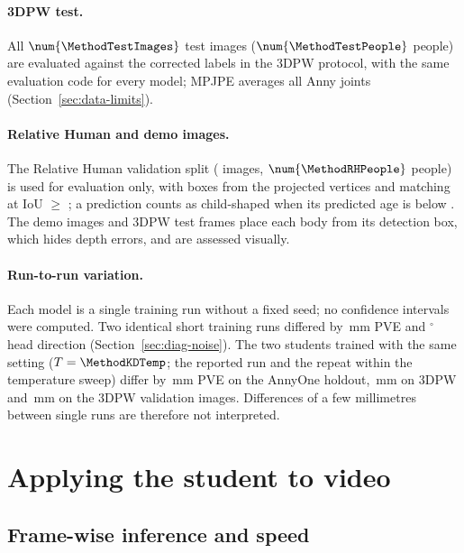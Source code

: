 \paragraph{3DPW test.} All $\num{\MethodTestImages}$ test images ($\num{\MethodTestPeople}$ people) are evaluated
against the corrected labels in the 3DPW protocol, with the same evaluation code for every model; MPJPE averages all
\MethodNumBones{} Anny joints (Section~\ref{sec:data-limits}).

\paragraph{Relative Human and demo images.} The Relative Human validation split (\MethodRHImages{} images,
$\num{\MethodRHPeople}$ people) is used for evaluation only, with boxes from the projected vertices and matching at
IoU $\ge$ \MethodRHIoU; a prediction counts as child-shaped when its predicted age is below \MethodChildThr. The
\MethodDemoPhotos{} demo images and \MethodDemoFrames{} 3DPW test frames place each body from its detection
box, which hides depth errors, and are assessed visually.

\paragraph{Run-to-run variation.}
\label{sec:method-variation}
Each model is a single training run without a fixed seed; no confidence intervals were computed. Two identical
short training runs differed by \NoisePVE\,mm PVE and \NoiseHeadDeg$^\circ$ head direction
(Section~\ref{sec:diag-noise}). The two students trained with the same setting ($T=\MethodKDTemp$; the reported run
and the repeat within the temperature sweep) differ by \KDNoiseHold\,mm PVE on the AnnyOne holdout, \KDNoiseTP\,mm
on 3DPW and \AblRunDiffVal\,mm on the 3DPW validation images. Differences of a few millimetres between single runs are therefore not interpreted.

\section{Applying the student to video}
\label{sec:method-video}

\subsection{Frame-wise inference and speed}
\label{sec:method-video-speed}

